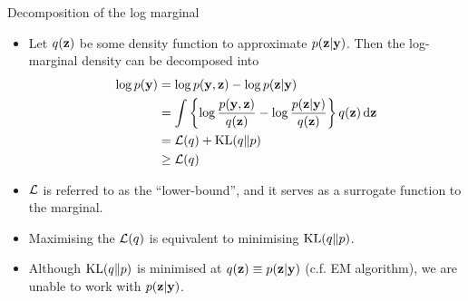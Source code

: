 \begin{frame}{Decomposition of the log marginal}  
  \vspace{-3pt}
  \begin{itemize}\setlength\itemsep{0.5em}
    \item Let $q({\mathbf z})$ be some density function to approximate $p({\mathbf z}|{\mathbf y})$. Then the log-marginal density can be decomposed into
    \begin{align*}
      \log p({\mathbf y}) &= \log p({\mathbf y},{\mathbf z}) - \log p({\mathbf z}|{\mathbf y}) \\
       &= \int \left\{ \log \frac{p({\mathbf y},{\mathbf z})}{q({\mathbf z})} - \log \frac{p({\mathbf z}|{\mathbf y})}{q({\mathbf z})} \right\} q({\mathbf z}) \, \text{d} {\mathbf z} \\    
      &=  {\mathcal L}(q) +  \operatorname{KL}(q \Vert p) \\
      &\geq {\mathcal L}(q)    
    \end{align*}
    \item ${\mathcal L}$ is referred to as the ``lower-bound'', and it serves as a surrogate function to the marginal.
    \item Maximising the ${\mathcal L}(q)$ is equivalent to minimising $\operatorname{KL}(q \Vert p)$.
    \item Although $\operatorname{KL}(q \Vert p)$ is minimised at $q({\mathbf z}) \equiv p({\mathbf z}|{\mathbf y})$ (c.f. EM algorithm), we are unable to work with $p({\mathbf z}|{\mathbf y})$.
  \end{itemize}
\end{frame}

